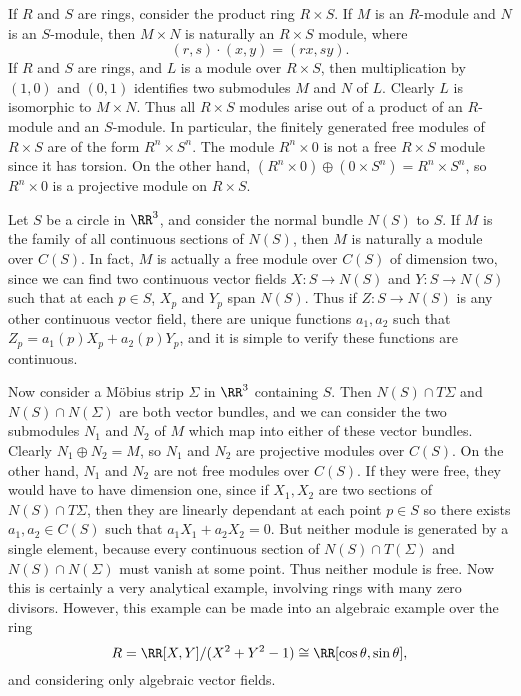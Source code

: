 \begin{example}
    If $R$ and $S$ are rings, consider the product ring $R \times S$. If $M$ is an $R$-module and $N$ is an $S$-module, then $M \times N$ is naturally an $R \times S$ module, where
    \[ (r,s) \cdot (x,y) = (rx, sy). \]
    If $R$ and $S$ are rings, and $L$ is a module over $R \times S$, then multiplication by $(1,0)$ and $(0,1)$ identifies two submodules $M$ and $N$ of $L$. Clearly $L$ is isomorphic to $M \times N$. Thus all $R \times S$ modules arise out of a product of an $R$-module and an $S$-module. In particular, the finitely generated free modules of $R \times S$ are of the form $R^n \times S^n$. The module $R^n \times 0$ is not a free $R \times S$ module since it has torsion. On the other hand, $(R^n \times 0) \oplus (0 \times S^n) = R^n \times S^n$, so $R^n \times 0$ is a projective module on $R \times S$.
\end{example}

\begin{example}
    Let $S$ be a circle in $\RR^3$, and consider the normal bundle $N(S)$ to $S$. If $M$ is the family of all continuous sections of $N(S)$, then $M$ is naturally a module over $C(S)$. In fact, $M$ is actually a free module over $C(S)$ of dimension two, since we can find two continuous vector fields $X: S \to N(S)$ and $Y: S \to N(S)$ such that at each $p \in S$, $X_p$ and $Y_p$ span $N(S)$. Thus if $Z: S \to N(S)$ is any other continuous vector field, there are unique functions $a_1,a_2$ such that $Z_p = a_1(p) X_p + a_2(p) Y_p$, and it is simple to verify these functions are continuous.

    Now consider a M\"{o}bius strip $\Sigma$ in $\RR^3$ containing $S$. Then $N(S) \cap T\Sigma$ and $N(S) \cap N(\Sigma)$ are both vector bundles, and we can consider the two submodules $N_1$ and $N_2$ of $M$ which map into either of these vector bundles. Clearly $N_1 \oplus N_2 = M$, so $N_1$ and $N_2$ are projective modules over $C(S)$. On the other hand, $N_1$ and $N_2$ are not free modules over $C(S)$. If they were free, they would have to have dimension one, since if $X_1, X_2$ are two sections of $N(S) \cap T\Sigma$, then they are linearly dependant at each point $p \in S$ so there exists $a_1, a_2 \in C(S)$ such that $a_1X_1 + a_2X_2 = 0$. But neither module is generated by a single element, because every continuous section of $N(S) \cap T(\Sigma)$ and $N(S) \cap N(\Sigma)$ must vanish at some point. Thus neither module is free. Now this is certainly a very analytical example, involving rings with many zero divisors. However, this example can be made into an algebraic example over the ring
    \[ R = \RR[X,Y]/(X^2 + Y^2 - 1) \cong \RR[\cos \theta, \sin \theta], \]
    and considering only algebraic vector fields.
\end{example}

